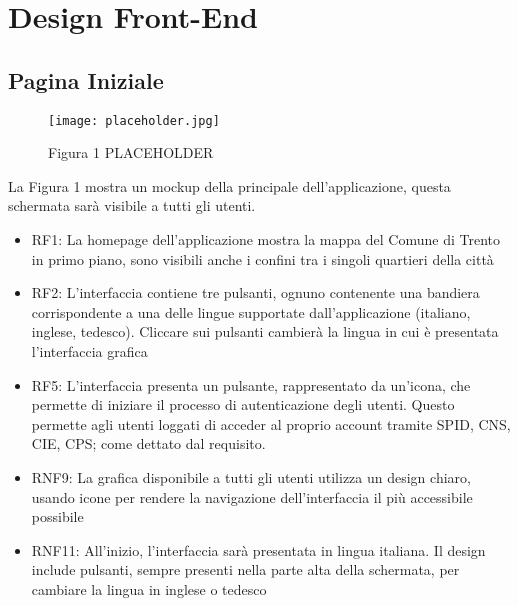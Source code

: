 \chapter{Design Front-End}
\thispagestyle{stdPage}


\section{Pagina Iniziale}

    \begin{figure}[H]
        \center
        \texttt{[image: placeholder.jpg]} %
        \caption{Figura 1 PLACEHOLDER}
    \end{figure}

    La Figura 1 mostra un mockup della principale dell'applicazione, questa schermata sarà visibile a tutti gli utenti.

    \begin{itemize} %
        \item RF1: La homepage dell'applicazione mostra la mappa del Comune di Trento in primo piano, sono visibili anche i confini tra i singoli quartieri della città
        \item RF2: L'interfaccia contiene tre pulsanti, ognuno contenente una bandiera corrispondente a una delle lingue supportate dall'applicazione (italiano, inglese, tedesco). Cliccare sui pulsanti cambierà la lingua in cui è presentata l'interfaccia grafica 
        \item RF5: L'interfaccia presenta un pulsante, rappresentato da un'icona, che permette di iniziare il processo di autenticazione degli utenti. Questo permette agli utenti loggati di acceder al proprio account tramite SPID, CNS, CIE, CPS; come dettato dal requisito.
        \item RNF9: La grafica disponibile a tutti gli utenti utilizza un design chiaro, usando icone per rendere la navigazione dell'interfaccia il più accessibile possibile
        \item RNF11: All'inizio, l'interfaccia sarà presentata in lingua italiana. Il design include pulsanti, sempre presenti nella parte alta della schermata, per cambiare la lingua in inglese o tedesco
    \end{itemize}



